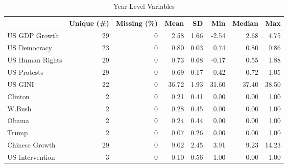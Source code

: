 \begin{table}

\caption{Year Level Variables}
\centering
\begin{tabular}[t]{lrrrrrrr}
\toprule
  & Unique (\#) & Missing (\%) & Mean & SD & Min & Median & Max\\
\midrule
US GDP Growth & 29 & 0 & 2.58 & 1.66 & -2.54 & 2.68 & 4.75\\
US Democracy & 23 & 0 & 0.80 & 0.03 & 0.74 & 0.80 & 0.86\\
US Human Rights & 29 & 0 & 0.73 & 0.68 & -0.17 & 0.55 & 1.88\\
US Protests & 29 & 0 & 0.69 & 0.17 & 0.42 & 0.72 & 1.05\\
US GINI & 22 & 0 & 36.72 & 1.93 & 31.60 & 37.40 & 38.50\\
Clinton & 2 & 0 & 0.21 & 0.41 & 0.00 & 0.00 & 1.00\\
W.Bush & 2 & 0 & 0.28 & 0.45 & 0.00 & 0.00 & 1.00\\
Obama & 2 & 0 & 0.24 & 0.44 & 0.00 & 0.00 & 1.00\\
Trump & 2 & 0 & 0.07 & 0.26 & 0.00 & 0.00 & 1.00\\
Chinese Growth & 29 & 0 & 9.02 & 2.45 & 3.91 & 9.23 & 14.23\\
US Intervention & 3 & 0 & -0.10 & 0.56 & -1.00 & 0.00 & 1.00\\
\bottomrule
\end{tabular}
\end{table}
